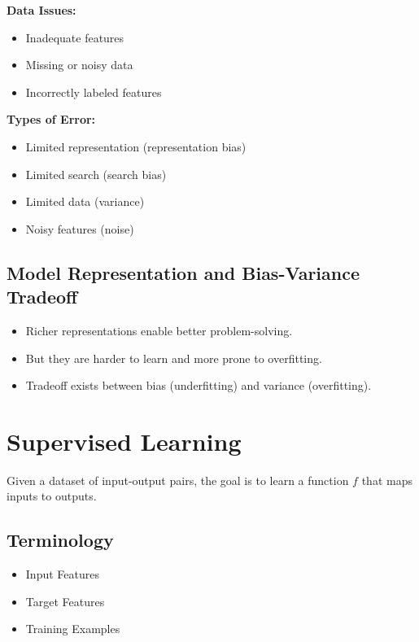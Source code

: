\textbf{Data Issues:}

\begin{itemize}
    \item Inadequate features
    \item Missing or noisy data
    \item Incorrectly labeled features
\end{itemize}

\textbf{Types of Error:}

\begin{itemize}
    \item Limited representation (representation bias)
    \item Limited search (search bias)
    \item Limited data (variance)
    \item Noisy features (noise)
\end{itemize}

\subsection{Model Representation and Bias-Variance Tradeoff}

\begin{itemize}
    \item Richer representations enable better problem-solving.
    \item But they are harder to learn and more prone to overfitting.
    \item Tradeoff exists between bias (underfitting) and variance (overfitting).
\end{itemize}

\section{Supervised Learning}

Given a dataset of input-output pairs, the goal is to learn a function $f$ that maps inputs to outputs.

\subsection{Terminology}

\begin{itemize}
    \item Input Features
    \item Target Features
    \item Training Examples
\end{itemize}

